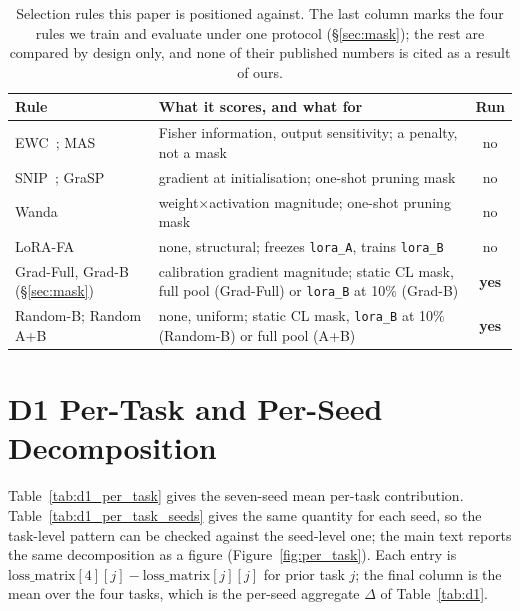 \begin{table}[h]
\centering
\footnotesize
\caption{Selection rules this paper is positioned against. The last column marks the four rules we train and evaluate under one protocol (\S\ref{sec:mask}); the rest are compared by design only, and none of their published numbers is cited as a result of ours.}
\label{tab:rule_positioning}
\begin{tabular}{@{}p{}p{}c@{}}
\toprule
\textbf{Rule} & \textbf{What it scores, and what for} & \textbf{Run} \\
\midrule
EWC~\citep{kirkpatrick2017overcoming}; MAS~\citep{aljundi2018memory} & Fisher information, output sensitivity; a penalty, not a mask & no \\
SNIP~\citep{lee2019snip}; GraSP~\citep{wang2020grasp} & gradient at initialisation; one-shot pruning mask & no \\
Wanda~\citep{sun2024wanda} & weight$\times$activation magnitude; one-shot pruning mask & no \\
LoRA-FA~\citep{zhang2023lorafa} & none, structural; freezes \texttt{lora\_A}, trains \texttt{lora\_B} & no \\
Grad-Full, Grad-B (\S\ref{sec:mask}) & calibration gradient magnitude; static CL mask, full pool (Grad-Full) or \texttt{lora\_B} at 10\% (Grad-B) & \textbf{yes} \\
Random-B; Random A+B~\citep{su2024random} & none, uniform; static CL mask, \texttt{lora\_B} at 10\% (Random-B) or full pool (A+B) & \textbf{yes} \\
\bottomrule
\end{tabular}
\end{table}

\section{D1 Per-Task and Per-Seed Decomposition}
\label{app:d1_per_task}

Table~\ref{tab:d1_per_task} gives the seven-seed mean per-task
contribution. Table~\ref{tab:d1_per_task_seeds} gives the same quantity for each
seed, so the task-level pattern can be checked against the seed-level one; the
main text reports the same decomposition as a figure (Figure~\ref{fig:per_task}). Each
entry is $\text{loss\_matrix}[4][j] - \text{loss\_matrix}[j][j]$ for prior task
$j$; the final column is the mean over the four tasks, which is the per-seed
aggregate $\Delta$ of Table~\ref{tab:d1}.

